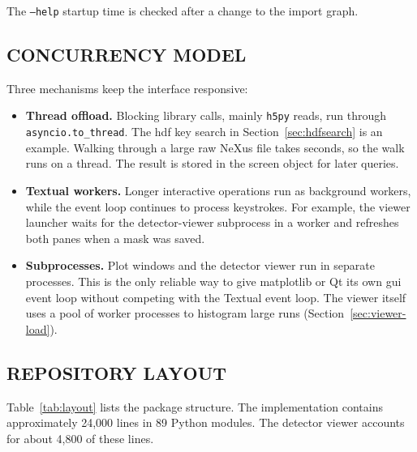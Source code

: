 \documentclass[tm]{ornltm}
\begin{document}
The \texttt{--help} startup time is checked after a change to the import graph.

\subsection{CONCURRENCY MODEL}

Three mechanisms keep the interface responsive:

\begin{itemize}
  \item \textbf{Thread offload.} Blocking library calls, mainly \texttt{h5py}
    reads, run through \texttt{asyncio.to\_thread}. The \ac{hdf} key search in
    Section~\ref{sec:hdfsearch} is an example. Walking through a large raw NeXus
    file takes seconds, so the walk runs on a thread. The result is stored in the
    screen object for later queries.
  \item \textbf{Textual workers.} Longer interactive operations run as
    background workers, while the event loop continues to process keystrokes.
    For example, the viewer launcher waits for the detector-viewer subprocess
    in a worker and refreshes both panes when a mask was saved.
  \item \textbf{Subprocesses.} Plot windows and the detector viewer run in
    separate processes. This is the only reliable way to give matplotlib or Qt
    its own \ac{gui} event loop without competing with the Textual event loop.
    The viewer itself uses a pool of worker processes to histogram large runs
    (Section~\ref{sec:viewer-load}).
\end{itemize}

\subsection{REPOSITORY LAYOUT}

Table~\ref{tab:layout} lists the package structure. The implementation contains
approximately 24,000 lines in 89 Python modules. The detector viewer accounts for
about 4,800 of these lines.
\end{document}
